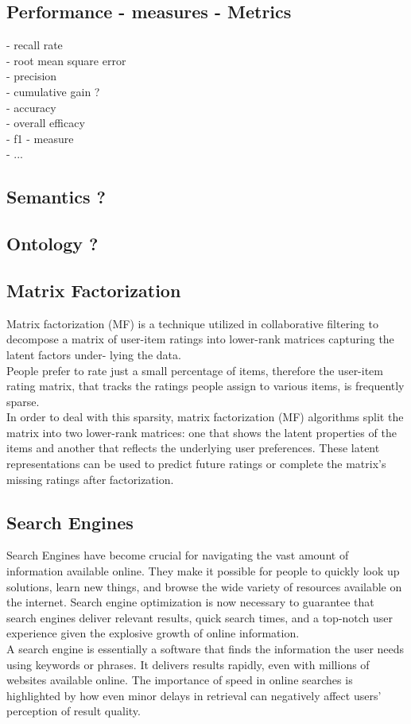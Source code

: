 \documentclass[10pt,oneside,english,a4paper]{article}
\begin{document}
\clearpage
\subsection{Performance - measures - Metrics}
- recall rate\\
- root mean square error\\
- precision\\
- cumulative gain ?\\
- accuracy\\
- overall efficacy\\
- f1 - measure\\
- ...\\


\clearpage
\subsection{Semantics ?}

\subsection{Ontology ?}

\subsection{Matrix Factorization}
Matrix factorization (MF) is a technique utilized in collaborative filtering to decompose
a matrix of user-item ratings into lower-rank matrices capturing the latent factors under-
lying the data\cite{Tokala2023}.\\
People prefer to rate just a small percentage of items, therefore the user-item rating matrix, that tracks the ratings people assign to various items, is frequently sparse.\\
In order to deal with this sparsity, matrix factorization (MF) algorithms split the matrix into two lower-rank matrices: one that shows the latent properties of the items and another that reflects the underlying user preferences. These latent representations can be used to predict future ratings or complete the matrix's missing ratings after factorization.

\subsection{Search Engines}
Search Engines have become crucial for navigating the vast amount of information available online. They make it possible for people to quickly look up solutions, learn new things, and browse the wide variety of resources available on the internet. Search engine optimization is now necessary to guarantee that search engines deliver relevant results, quick search times, and a top-notch user experience given the explosive growth of online information.\\
A search engine is essentially a software that finds the information the user needs using keywords or phrases. It delivers results rapidly, even with millions of websites available online.
The importance of speed in online searches is highlighted by how even minor delays in retrieval can negatively affect users' perception of result quality.
\cite{pub.1171882357}
\end{document}

